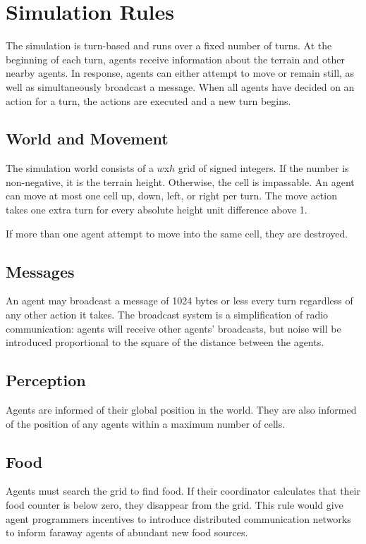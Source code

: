 \section{Simulation Rules}
\label{rules}

The simulation is turn-based and runs over a fixed number of turns. At the beginning of each turn, agents receive information about the terrain and other nearby agents. In response, agents can either attempt to move or remain still, as well as simultaneously broadcast a message. When all agents have decided on an action for a turn, the actions are executed and a new turn begins.

\subsection{World and Movement}

The simulation world consists of a $w$x$h$ grid of signed integers. If the number is non-negative, it is the terrain height. Otherwise, the cell is impassable. An agent can move at most one cell up, down, left, or right per turn. The move action takes one extra turn for every absolute height unit difference above 1.

If more than one agent attempt to move into the same cell, they are destroyed.

\subsection{Messages}

An agent may broadcast a message of 1024 bytes or less every turn regardless of any other action it takes. The broadcast system is a simplification of radio communication: agents will receive other agents' broadcasts, but noise will be introduced proportional to the square of the distance between the agents.

\subsection{Perception}

Agents are informed of their global position in the world. They are also informed of the position of any agents within a maximum number of cells.

\subsection{Food}

Agents must search the grid to find food. If their coordinator calculates that their food counter is below zero, they disappear from the grid. This rule would give agent programmers incentives to introduce distributed communication networks to inform faraway agents of abundant new food sources.

